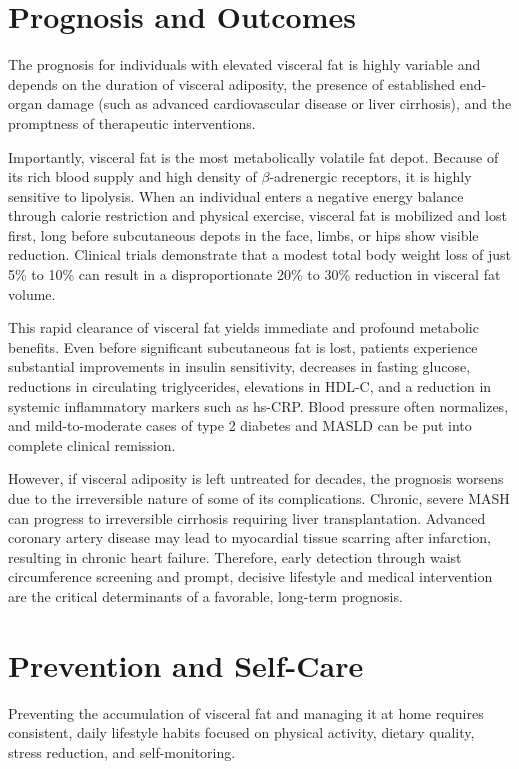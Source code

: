 \section*{Prognosis and Outcomes}
The prognosis for individuals with elevated visceral fat is highly variable and depends on the duration of visceral adiposity, the presence of established end-organ damage (such as advanced cardiovascular disease or liver cirrhosis), and the promptness of therapeutic interventions.

Importantly, visceral fat is the most metabolically volatile fat depot. Because of its rich blood supply and high density of $\beta$-adrenergic receptors, it is highly sensitive to lipolysis. When an individual enters a negative energy balance through calorie restriction and physical exercise, visceral fat is mobilized and lost first, long before subcutaneous depots in the face, limbs, or hips show visible reduction. Clinical trials demonstrate that a modest total body weight loss of just 5\% to 10\% can result in a disproportionate 20\% to 30\% reduction in visceral fat volume.

This rapid clearance of visceral fat yields immediate and profound metabolic benefits. Even before significant subcutaneous fat is lost, patients experience substantial improvements in insulin sensitivity, decreases in fasting glucose, reductions in circulating triglycerides, elevations in HDL-C, and a reduction in systemic inflammatory markers such as hs-CRP. Blood pressure often normalizes, and mild-to-moderate cases of type 2 diabetes and MASLD can be put into complete clinical remission.

However, if visceral adiposity is left untreated for decades, the prognosis worsens due to the irreversible nature of some of its complications. Chronic, severe MASH can progress to irreversible cirrhosis requiring liver transplantation. Advanced coronary artery disease may lead to myocardial tissue scarring after infarction, resulting in chronic heart failure. Therefore, early detection through waist circumference screening and prompt, decisive lifestyle and medical intervention are the critical determinants of a favorable, long-term prognosis.

\section*{Prevention and Self-Care}
Preventing the accumulation of visceral fat and managing it at home requires consistent, daily lifestyle habits focused on physical activity, dietary quality, stress reduction, and self-monitoring.


